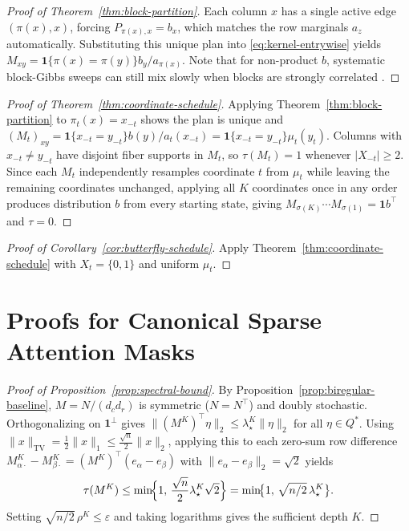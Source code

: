 \documentclass[10pt]{article}
\newcommand{\one}{\mathbf{1}}
\newcommand{\TV}{\mathrm{TV}}
\begin{document}
\begin{proof}[Proof of Theorem~\ref{thm:block-partition}]
Each column $x$ has a single active edge $(\pi(x), x)$, forcing $P_{\pi(x), x} = b_x$, which matches the row marginals $a_z$ automatically. Substituting this unique plan into \eqref{eq:kernel-entrywise} yields $M_{xy} = \one\{\pi(x)=\pi(y)\} b_y / a_{\pi(x)}$. Note that for non-product $b$, systematic block-Gibbs sweeps can still mix slowly when blocks are strongly correlated \citep{geman1984stochastic,levin2017markov}.
\end{proof}

\begin{proof}[Proof of Theorem~\ref{thm:coordinate-schedule}]
Applying Theorem~\ref{thm:block-partition} to $\pi_t(x) = x_{-t}$ shows the plan is unique and $(M_t)_{xy} = \one\{x_{-t}=y_{-t}\} b(y)/a_t(x_{-t}) = \one\{x_{-t}=y_{-t}\} \mu_t(y_t)$. Columns with $x_{-t} \neq y_{-t}$ have disjoint fiber supports in $M_t$, so $\tau(M_t) = 1$ whenever $|X_{-t}| \ge 2$. Since each $M_t$ independently resamples coordinate $t$ from $\mu_t$ while leaving the remaining coordinates unchanged, applying all $K$ coordinates once in any order produces distribution $b$ from every starting state, giving $M_{\sigma(K)}\cdots M_{\sigma(1)} = \one b^\top$ and $\tau = 0$.
\end{proof}

\begin{proof}[Proof of Corollary~\ref{cor:butterfly-schedule}]
Apply Theorem~\ref{thm:coordinate-schedule} with $X_t = \{0,1\}$ and uniform $\mu_t$.
\end{proof}

\section{Proofs for Canonical Sparse Attention Masks}
\label{app:canonical-proofs}

\begin{proof}[Proof of Proposition~\ref{prop:spectral-bound}]
By Proposition~\ref{prop:biregular-baseline}, $M = N/(d_c d_r)$ is symmetric ($N = N^\top$) and doubly stochastic. Orthogonalizing on $\one^\perp$ gives $\|(M^K)^\top \eta\|_2 \le \lambda_\star^K \|\eta\|_2$ for all $\eta \in Q^*$. Using $\|x\|_{\TV} = \frac{1}{2}\|x\|_1 \le \frac{\sqrt{n}}{2}\|x\|_2$, applying this to each zero-sum row difference $M^K_{\alpha\cdot} - M^K_{\beta\cdot} = (M^K)^\top (e_\alpha - e_\beta)$ with $\|e_\alpha - e_\beta\|_2 = \sqrt{2}$ yields
\[
  \tau(M^K) \le \min\!\Bigl\{1,\, \frac{\sqrt{n}}{2}\lambda_\star^K \sqrt{2}\Bigr\}
  = \min\!\bigl\{1,\, \sqrt{n/2}\,\lambda_\star^K\bigr\}.
\]
Setting $\sqrt{n/2}\,\rho^K \le \varepsilon$ and taking logarithms gives the sufficient depth $K$.
\end{proof}
\end{document}
